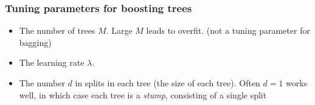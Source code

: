 \documentclass{beamer}
\begin{document}
                             
                            		

                           
                             \begin{frame}
                             	\frametitle{Tuning parameters for boosting trees}
                             	\begin{itemize}
                             		\item  The number of trees $M$. Large $M$ leads to overfit. (not a tuning parameter for bagging)
                             		 
                             		\item  The learning rate $\lambda$. 
                             		\item   The number $d$ in splits in each tree (the size of each tree). 
                             		Often $d=1$ works well, in which case each
                             		tree is a {\it stump}, consisting of a single split
                             	 
                             	 
                             		
                             	\end{itemize}
                             \end{frame}   
                            
\end{document}
